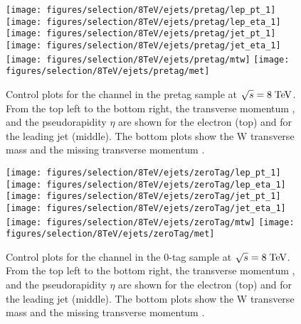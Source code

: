 \begin{figure}
  \centering
  \texttt{[image: figures/selection/8TeV/ejets/pretag/lep\_pt\_1]}
  \texttt{[image: figures/selection/8TeV/ejets/pretag/lep\_eta\_1]}
  \texttt{[image: figures/selection/8TeV/ejets/pretag/jet\_pt\_1]}
  \texttt{[image: figures/selection/8TeV/ejets/pretag/jet\_eta\_1]}
  \texttt{[image: figures/selection/8TeV/ejets/pretag/mtw]}
  \texttt{[image: figures/selection/8TeV/ejets/pretag/met]}
  \caption[Control plots for the \ejets{} channel in the pretag
    sample at $\sqrt{s} = 8 \TeV{}$]{Control plots for the \ejets{} channel in the pretag
    sample at $\sqrt{s} = 8 \TeV{}$.  From the top left to the bottom right, the transverse
    momentum \pt{}, and the pseudorapidity $\eta$ are shown for the
    electron (top) and for the leading jet (middle). The bottom plots
    show the W transverse mass \mtw{} and the missing transverse
    momentum \met{}. 
  }
  \label{fig:2012ele_pretag}
\end{figure}
%
\begin{figure}
  \centering
  \texttt{[image: figures/selection/8TeV/ejets/zeroTag/lep\_pt\_1]}
  \texttt{[image: figures/selection/8TeV/ejets/zeroTag/lep\_eta\_1]}
  \texttt{[image: figures/selection/8TeV/ejets/zeroTag/jet\_pt\_1]}
  \texttt{[image: figures/selection/8TeV/ejets/zeroTag/jet\_eta\_1]}
  \texttt{[image: figures/selection/8TeV/ejets/zeroTag/mtw]}
  \texttt{[image: figures/selection/8TeV/ejets/zeroTag/met]}
  \caption[Control plots for the \ejets{} channel in the 0-tag
    sample at $\sqrt{s} = 8 \TeV{}$]{Control plots for the \ejets{} channel in the 0-tag
    sample at $\sqrt{s} = 8 \TeV{}$.  From the top left to the bottom right, the transverse
    momentum \pt{}, and the pseudorapidity $\eta$ are shown for the
    electron (top) and for the leading jet (middle). The bottom plots
    show the W transverse mass \mtw{} and the missing transverse
    momentum \met{}.
  }
  \label{fig:2012ele_0tag}
\end{figure}
%

